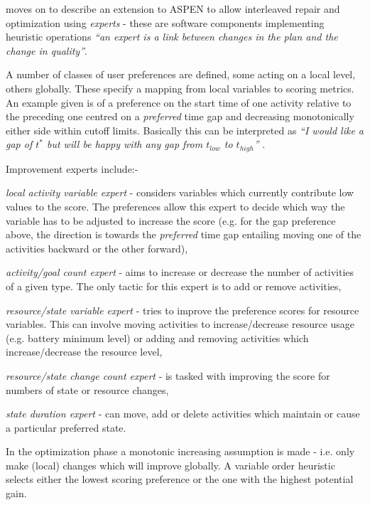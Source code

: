 \citet{rabideau00generic} moves on to describe an extension to ASPEN to allow interleaved repair and optimization using \emph{experts} - these are software components implementing heuristic operations \emph{``an expert is a link between changes in the plan and the change in quality''}. 

A number of classes of user preferences are defined, some acting on a local level, others globally. These specify a mapping from local variables to scoring metrics. An example given is of a preference on the start time of one activity relative to the preceding one centred on a \emph{preferred} time gap and decreasing monotonically either side within cutoff limits. Basically this can be interpreted as \emph{``I would like a gap of $t^*$ but will be happy with any gap from $t_{low}$ to $t_{high}$''} . 

Improvement experts include:- \begin{inparaenum} \item \emph{local activity variable expert} - considers variables which currently contribute low values to the score. The preferences allow this expert to decide which way the variable has to be adjusted to increase the score (e.g. for the gap preference above, the direction is towards the \emph{preferred} time gap entailing moving one of the activities backward or the other forward), \item \emph{activity/goal count expert} - aims to increase or decrease the number of activities of a given type. The only tactic for this expert is to add or remove activities, \item \emph{resource/state variable expert} - tries to improve the preference scores for resource variables. This can involve moving activities to increase/decrease resource usage (e.g. battery minimum level) or adding and removing activities which increase/decrease the resource level, \item \emph{resource/state change count expert} - is tasked with improving the score for numbers of state or resource changes, \item \emph{state duration expert} - can move, add or delete activities which maintain or cause a particular preferred state.\end{inparaenum}

In the optimization phase a monotonic increasing assumption is made - i.e. only make (local) changes which will improve globally. A variable order heuristic selects either the lowest scoring preference or the one with the highest potential gain.

